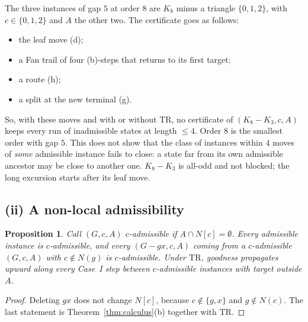\documentclass[11pt]{amsart}
\newtheorem{proposition}[theorem]{Proposition}
\theoremstyle{definition}
\newcommand{\TR}{\mathrm{TR}}
\begin{document}
The three instances of gap $5$ at order $8$ are $K_8$ minus a triangle $\{0,1,2\}$, with $c\in\{0,1,2\}$
and $A$ the other two. The certificate goes as follows:
\begin{itemize}
\item the leaf move (d);
\item a Fan trail of four (b)-steps that returns to its first target;
\item a route (h);
\item a split at the new terminal (g).
\end{itemize}
So, with these moves and with or without $\TR$, no certificate of $(K_8-K_3,c,A)$ keeps every run of
inadmissible states at length $\le4$. Order $8$ is the smallest order with gap $5$. This does not
show that the class of instances within $4$ moves of \emph{some} admissible instance fails to close:
a state far from its own admissible ancestor may be close to another one. $K_8-K_3$ is all-odd and
not blocked; the long excursion starts after its leaf move.

\subsection{(ii) A non-local admissibility}

\begin{proposition}\label{prop:cadm}
Call $(G,c,A)$ \emph{$c$-admissible} if $A\cap N[c]=\emptyset$. Every admissible instance is
$c$-admissible, and every $(G-gx,c,A)$ coming from a $c$-admissible $(G,c,A)$ with $c\notin N(g)$ is
$c$-admissible. Under $\TR$, goodness propagates upward along every Case~I step between
$c$-admissible instances with target outside $A$.
\end{proposition}

\begin{proof}
Deleting $gx$ does not change $N[c]$, because $c\notin\{g,x\}$ and $g\notin N(c)$. The last statement
is Theorem~\ref{thm:calculus}(b) together with $\TR$.
\end{proof}
\end{document}
